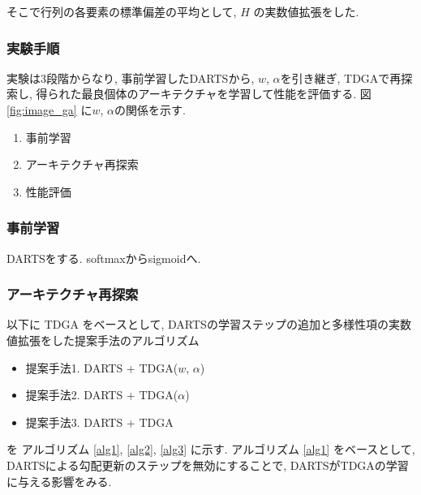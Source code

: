 そこで行列の各要素の標準偏差の平均として, $H$ の実数値拡張をした.


\subsubsection{実験手順}
実験は3段階からなり, 事前学習したDARTSから, $w$, $\alpha$を引き継ぎ,
TDGAで再探索し, 得られた最良個体のアーキテクチャを学習して性能を評価する.
図 \ref{fig:image_ga} に$w$, $\alpha$の関係を示す.

\begin{enumerate}
  \item 事前学習
  \item アーキテクチャ再探索
  \item 性能評価
\end{enumerate}

\subsubsection{事前学習}
DARTSをする.
softmaxからsigmoidへ.


\subsubsection{アーキテクチャ再探索}

以下に TDGA をベースとして, DARTSの学習ステップの追加と多様性項の実数値拡張をした提案手法のアルゴリズム

\begin{itemize}
  \item 提案手法1. DARTS + TDGA($w$, $\alpha$)
  \item 提案手法2. DARTS + TDGA($\alpha$)
  \item 提案手法3. DARTS + TDGA
\end{itemize}

\noindent
を アルゴリズム \ref{alg1}, \ref{alg2}, \ref{alg3} に示す.
アルゴリズム \ref{alg1} をベースとして, DARTSによる勾配更新のステップを無効にすることで,
DARTSがTDGAの学習に与える影響をみる.

